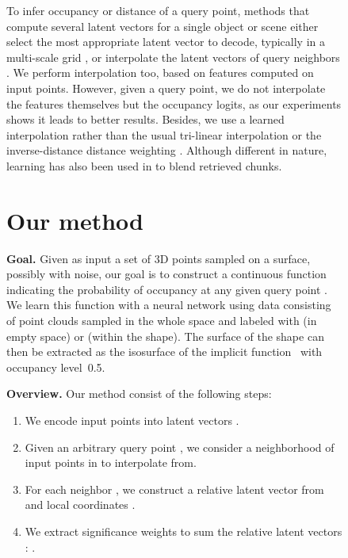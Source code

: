\documentclass[10pt,twocolumn,letterpaper]{article}
\begin{document}
\begin{figure}[t]
To infer occupancy or distance of a query point, methods that compute several latent vectors for a single object or scene either select the most appropriate latent vector to decode, typically in a multi-scale grid \cite{Ummenhofer2021Adaptive}, or interpolate the latent vectors of query neighbors \cite{Chibane2020CVPR, Jiang2020CVPR, Peng2020ECCV, Chibane2020Neural, Lionar_2021_WACV, tang2021sign}. We perform interpolation too, based on features computed on input points. However, given a query point, we do not interpolate the features themselves but the occupancy logits, as our experiments shows it leads to better results. Besides, we use a learned interpolation rather than the usual tri-linear interpolation \cite{Chibane2020CVPR, Jiang2020CVPR, Peng2020ECCV, Chibane2020Neural, Lionar_2021_WACV, tang2021sign} or the inverse-distance distance weighting \cite{Qi2017NIPS}. Although different in nature, learning has also been used in \cite{Siddiqui2021RetrievalFuse} to blend retrieved chunks.
 
\section{Our method}

\textbf{Goal.} Given as input a set of  3D points  sampled on a surface, possibly with noise, our goal is to construct a continuous function  indicating the probability of occupancy  at any given query point . We learn this function with a neural network using data consisting of point clouds sampled in the whole space and labeled with  (in empty space) or  (within the shape). The surface of the shape can then be extracted as the isosurface of the implicit function~ with occupancy level~0.5.

\textbf{Overview.} Our method consist of the following steps:
\begin{enumerate}[itemsep=-2pt,topsep=-1pt]

    \item We encode input points  into latent vectors .
    
    \item Given an arbitrary query point , we consider a neighborhood  of input points in  to  interpolate from.

    \item For each neighbor , we construct a relative latent vector  from  and local coordinates .\label{decodefirst}
    
    \item We extract significance weights  to sum the relative latent vectors : .
    

\end{enumerate}
\end{figure}
\end{document}

